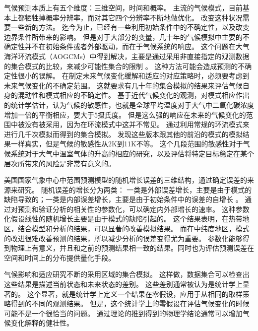气候预测本质上有五个维度：三维空间，时间和概率。 
主流的气候模式，目前基本上都牺牲掉概率分辨率，而对其它四个分辨率不断地做优化。
改变这种状况需要一些新的方法。
迄今为止，已经有一些利用初始条件中的不确定性，以及改变边界条件所带来的影响。
但是对于大部分的变量，几十年的气候模拟中主要的不确定性并不在初始条件或者外部驱动，而在于气候系统的响应。
这个问题在大气海洋环流模式（AOGCMs）中得到解决，主要是通过采用非直接指定的观测数据的集合模式的比较，来减少可能性集合的限制\cite{allen2002towards} 。 
这种方法可能会造成预测的不确定性很小的误解。
在制定未来气候变化缓解和适应的对应策略时，必须要考虑到未来气候变化的不确定范围。
这就要求有几十年的集合模拟的结果来评估气候自身的混动性和模式相应的不确定性。 
基于近代气候变化的观测，对模式相应作出的统计学估计，认为气候的敏感性，也就是全球平均温度对于大气中二氧化碳浓度增加一倍的平衡相应，要大于5摄氏度\cite{stainforth2005uncertainty}。
但是这么强的响应在未来的气候变化的范围中被没有被采用，因为在环流模式中这并不常见。 
通过利用常规的环流模式来进行几千次模拟而得到的集合模拟。 发现这些版本跟其他的前沿的模式的模拟结果一样真实，但是气候的敏感性从2K到11K不等。
这个几段范围的敏感性对于气候系统对于大气中温室气体的升高的相应的研究，以及评估将特定目标稳定在某个层次所带来的风险是非常有意义的。


 

 
美国国家气象中心中范围预测模型的随机增长误差的三维结构，通过确定误差的来源来研究。
随机误差的增长分为两类： 一类是外部误差增长，主要是由于模式的缺陷导致的；一类是内部误差增长，主要是由于初始条件中的误差的自增长\cite{reynolds1994random} 。 
通过对预测和验证分析的相关性的参数化，可以确定内外部增长的速率。
这种参数化假设线性的随机增长主要是由于模式的缺陷引起的。 
这个结果表明，在热带地区，结合模型和分析的结果，可以显著的改善模拟结果。
而在中纬度地区，模式的改进很难改善预测的结果，所以减少分析的误差变得尤为重要。 
参数化能够得到物理上有意义，并且和之前的预测结果相一致的结果。同时也为评估预测误差在空间和时间上的分布提供量化手段。
 



 
气候影响和适应研究不断的采用区域的集合模拟\cite{von2013testing}。
这样做，数据集合可以检查出这些结果是描述当前状态和未来状态的差别。
这些差别通常被认为是统计学上显著的。
这个显著，就是统计学上定义一个结果在零假设，应用于从相同的取样策略得到的不同的观测结果。 
但是，这个统计学上的零假设在评估气候变化的时候可能不是一个很恰当的问题。 
通过理论的推到得到的物理学结论通常可以增加气候变化解释的健壮性。





